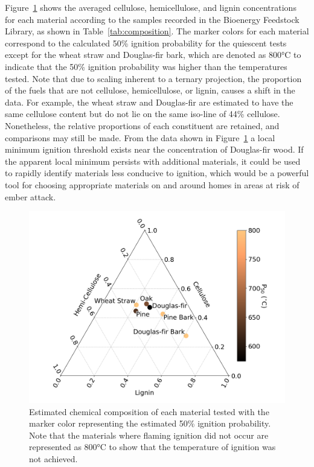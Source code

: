     Figure~\ref{fig:composition_plot} shows the averaged cellulose, hemicellulose, and lignin concentrations for each material according to the samples recorded in the Bioenergy Feedstock Library, as shown in Table~\ref{tab:composition}. The marker colors for each material correspond to the calculated 50\% ignition probability for the quiescent tests except for the wheat straw and Douglas-fir bark, which are denoted as 800\si{\celsius} to indicate that the 50\% ignition probability was higher than the temperatures tested. Note that due to scaling inherent to a ternary projection, the proportion of the fuels that are not cellulose, hemicellulose, or lignin, causes a shift in the data. For example, the wheat straw and Douglas-fir are estimated to have the same cellulose content but do not lie on the same iso-line of 44\% cellulose. Nonetheless, the relative proportions of each constituent are retained, and comparisons may still be made. From the data shown in Figure~\ref{fig:composition_plot} a local minimum ignition threshold exists near the concentration of Douglas-fir wood. If the apparent local minimum persists with additional materials, it could be used to rapidly identify materials less conducive to ignition, which would be a powerful tool for choosing appropriate materials on and around homes in areas at risk of ember attack. 
        \begin{figure}[htpb]
            \centering
            \includegraphics[width=0.75\columnwidth]{Figures/speciesStudyTernaryDiss.png}
            \caption{Estimated chemical composition of each material tested with the marker color representing the estimated 50\% ignition probability. Note that the materials where flaming ignition did not occur are represented as 800\si{\celsius} to show that the temperature of ignition was not achieved.}
            \label{fig:composition_plot}
        \end{figure}
    
